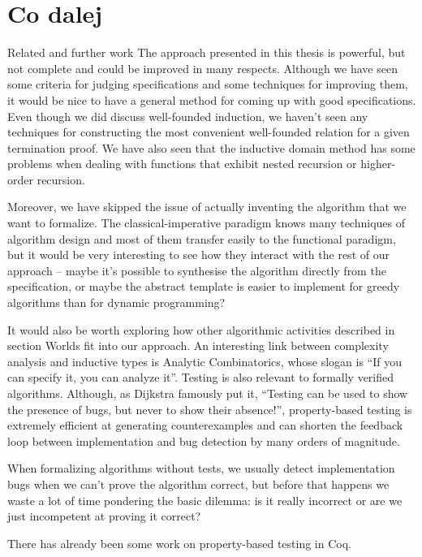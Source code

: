 \documentclass{beamer}
\begin{document}
\section{Co dalej}

\begin{frame}{Related and further work}
	The approach presented in this thesis is powerful, but not complete and could be improved in many respects. Although we have seen some criteria for judging specifications and some techniques for improving them, it would be nice to have a general method for coming up with good specifications. Even though we did discuss well-founded induction, we haven't seen any techniques for constructing the most convenient well-founded relation for a given termination proof. We have also seen that the inductive domain method has some problems when dealing with functions that exhibit nested recursion or higher-order recursion.

	Moreover, we have skipped the issue of actually inventing the algorithm that we want to formalize. The classical-imperative paradigm knows many techniques of algorithm design and most of them transfer easily to the functional paradigm, but it would be very interesting to see how they interact with the rest of our approach -- maybe it's possible to synthesise the algorithm directly from the specification, or maybe the abstract template is easier to implement for greedy algorithms than for dynamic programming?
	
	It would also be worth exploring how other algorithmic activities described in section Worlds fit into our approach. An interesting link between complexity analysis and inductive types is Analytic Combinatorics, whose slogan is ``If you can specify it, you can analyze it''. Testing is also relevant to formally verified algorithms. Although, as Dijkstra famously put it, ``Testing can be used to show the presence of bugs, but never to show their absence!'', property-based testing is extremely efficient at generating counterexamples and can shorten the feedback loop between implementation and bug detection by many orders of magnitude.
	
	When formalizing algorithms without tests, we usually detect implementation bugs when we can't prove the algorithm correct, but before that happens we waste a lot of time pondering the basic dilemma: is it really incorrect or are we just incompetent at proving it correct?
	
	There has already been some work on property-based testing in Coq.
\end{frame}
\end{document}
